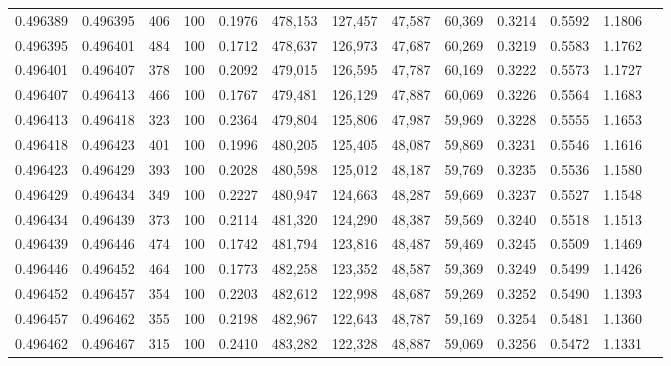\begin{tabular}{rrrrrrrrrrrrr}
0.496389 & 0.496395 &   406 & 100 &                                     0.1976 & 478,153 & 127,457 &  47,587 &  60,369 & 0.3214 & 0.5592 & 1.1806 \\
0.496395 & 0.496401 &   484 & 100 &                                     0.1712 & 478,637 & 126,973 &  47,687 &  60,269 & 0.3219 & 0.5583 & 1.1762 \\
0.496401 & 0.496407 &   378 & 100 &                                     0.2092 & 479,015 & 126,595 &  47,787 &  60,169 & 0.3222 & 0.5573 & 1.1727 \\
0.496407 & 0.496413 &   466 & 100 &                                     0.1767 & 479,481 & 126,129 &  47,887 &  60,069 & 0.3226 & 0.5564 & 1.1683 \\
0.496413 & 0.496418 &   323 & 100 &                                     0.2364 & 479,804 & 125,806 &  47,987 &  59,969 & 0.3228 & 0.5555 & 1.1653 \\
0.496418 & 0.496423 &   401 & 100 &                                     0.1996 & 480,205 & 125,405 &  48,087 &  59,869 & 0.3231 & 0.5546 & 1.1616 \\
0.496423 & 0.496429 &   393 & 100 &                                     0.2028 & 480,598 & 125,012 &  48,187 &  59,769 & 0.3235 & 0.5536 & 1.1580 \\
0.496429 & 0.496434 &   349 & 100 &                                     0.2227 & 480,947 & 124,663 &  48,287 &  59,669 & 0.3237 & 0.5527 & 1.1548 \\
0.496434 & 0.496439 &   373 & 100 &                                     0.2114 & 481,320 & 124,290 &  48,387 &  59,569 & 0.3240 & 0.5518 & 1.1513 \\
0.496439 & 0.496446 &   474 & 100 &                                     0.1742 & 481,794 & 123,816 &  48,487 &  59,469 & 0.3245 & 0.5509 & 1.1469 \\
0.496446 & 0.496452 &   464 & 100 &                                     0.1773 & 482,258 & 123,352 &  48,587 &  59,369 & 0.3249 & 0.5499 & 1.1426 \\
0.496452 & 0.496457 &   354 & 100 &                                     0.2203 & 482,612 & 122,998 &  48,687 &  59,269 & 0.3252 & 0.5490 & 1.1393 \\
0.496457 & 0.496462 &   355 & 100 &                                     0.2198 & 482,967 & 122,643 &  48,787 &  59,169 & 0.3254 & 0.5481 & 1.1360 \\
0.496462 & 0.496467 &   315 & 100 &                                     0.2410 & 483,282 & 122,328 &  48,887 &  59,069 & 0.3256 & 0.5472 & 1.1331 \\

\end{tabular}
